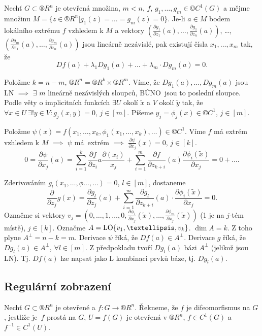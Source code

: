 \documentclass[12pt]{article}					%
\begin{document}
	\begin{veta}
		Nechť $G \subset ®R^n$ je otevřená množina, $m < n$, $f$, $g_1, …, g_m \in ©C^1(G)$ a mějme množinu $M = \{z \in ®R^n | g_1(z) = … = g_m(z) = 0\}$. Je-li $a \in M$ bodem lokálního extrému $f$ vzhledem k $M$ a vektory $(\frac{\partial g_1}{\partial z_1}(a), …, \frac{\partial g_1}{\partial z_n}(a))$, …, $(\frac{\partial g_m}{\partial z_1}(a), …, \frac{\partial g_m}{\partial z_n}(a))$ jsou lineárně nezávislé, pak existují čísla $x_1, …, x_m$ tak, že\
		$$ Df(a) + \lambda_1Dg_1(a) + … + \lambda_m·Dg_m(a) = 0. $$

		\begin{dukazin}
			Položme $k = n - m$, $®R^n = ®R^k \times ®R^m$. Víme, že $Dg_1(a), …, Dg_m(a)$ jsou LN $\implies$ $\exists$ $m$ lineárně nezávislých sloupců, BÚNO jsou to poslední sloupce. Podle věty o implicitních funkcích $\exists U$ okolí $\tilde x$ a $V$ okolí $\tilde y$ tak, že $\forall x \in U\ \exists!y \in V: g_j(x, y) = 0$, $j \in [m]$. Píšeme $y_j = \phi_j(x) \in ©C^1$, $j \in [m]$.

			Položme $\psi(x) = f(x_1, …, x_k, \phi_1(x_1, …, x_k), …) \in ©C^1$. Víme $f$ má extrém vzhledem k $M$ $\implies$ $\psi$ má extrém $\implies$ $\frac{\partial\psi}{\partial x_j}(x) = 0$, $j \in [k]$.
			$$ 0 = \frac{\partial \psi}{\partial x_j}(a) = \sum_{i=1}^k \frac{\partial f}{\partial z_i}a \frac{\partial(x_i)}{x_j} + \sum_{i=1}^m \frac{\partial f}{\partial z_{k+i}} (a) \frac{\partial \phi_i(\tilde x)}{\partial x_j} = 0 + …. $$

			Zderivováním $g_l(x_1, …, \phi…, …) = 0$, $l \in [m]$, dostaneme
			$$ \frac{\partial}{\partial z_j}g(x) = \frac{\partial g_l}{\partial z_j}(a)  + \sum_{i=1}^m \frac{\partial g_l}{\partial z_{k+i}}(a)·\frac{\partial \phi_i(\tilde x)}{\partial x_j} = 0. $$
			Označme si vektory $v_j = (0, …, 1, …, 0, \frac{\partial \phi_1}{\partial x_j}(\tilde x), …, \frac{\partial \phi_m}{\partial x_j}(\tilde x))$ (1 je na $j$-tém místě), $j \in [k]$. Označme $A = \LO\{v_1, …, v_k\}$. $\dim A = k$. Z toho plyne $A^\perp = n - k = m$. Derivace $\psi$ říká, že $Df(a) \in A^\perp$. Derivace $g$ říká, že $Dg_l(a) \in A^\perp$, $\forall l \in [m]$. Z předpokladu tvoří $Dg_l(a)$ bázi $A^\perp$ (jelikož jsou LN). Tj. $Df(a)$ lze napsat jako L kombinaci prvků báze, tj. $Dg_l(a)$.
		\end{dukazin}
	\end{veta}
	

	\subsection{Regulární zobrazení}
	\begin{definice}[Difeomorfismus]
		Nechť $G \subset ®R^n$ je otevřené a $f: G \rightarrow ®R^n$. Řekneme, že $f$ je difeomorfismus na $G$, jestliže je $f$ prostá na $G$, $U = f(G)$ je otevřená v $®R^n$, $f \in C^1(G)$ a $f^{-1} \in C^1(U)$.
	\end{definice}
\end{document}

